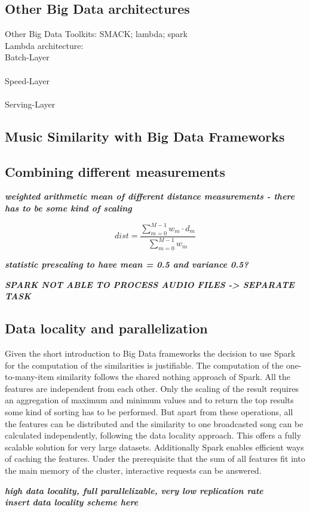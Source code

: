 \subsection{Other Big Data architectures}

Other Big Data Toolkits: SMACK; lambda; spark\\
Lambda architecture:\\
Batch-Layer\\
\ \\
Speed-Layer\\
\ \\
Serving-Layer\\

\subsection{Music Similarity with Big Data Frameworks}

\subsection{Combining different measurements}

\noindent\textit{\textbf{weighted arithmetic mean of different distance measurements - there has to be some kind of scaling\\}}

\begin{equation} \label{eq:distance}
dist = \frac{\sum_{m = 0}^{M - 1}{w_m \cdot d_m}}{\sum_{m = 0}^{M - 1}{w_m}}
\end{equation}

\noindent\textit{\textbf{statistic prescaling to have mean = 0.5 and variance 0.5?\\}}

\textit{\textbf{SPARK NOT ABLE TO PROCESS AUDIO FILES -> SEPARATE TASK}}

\subsection{Data locality and parallelization}

Given the short introduction to Big Data frameworks the decision to use Spark for the computation of the similarities is justifiable. The computation of the one-to-many-item similarity follows the shared nothing approach of Spark. All the features are independent from each other. Only the scaling of the result requires an aggregation of maximum and minimum values and to return the top results some kind of sorting has to be performed. But apart from these operations, all the features can be distributed and the similarity to one broadcasted song can be calculated independently, following the data locality approach. This offers a fully scalable solution for very large datasets. Additionally Spark enables efficient ways of caching the features. Under the prerequisite that the sum of all features fit into the main memory of the cluster, interactive requests can be answered. 

\noindent\textit{\textbf{high data locality, full parallelizable, very low replication rate\\}}
\noindent\textit{\textbf{insert data locality scheme here\\}}
